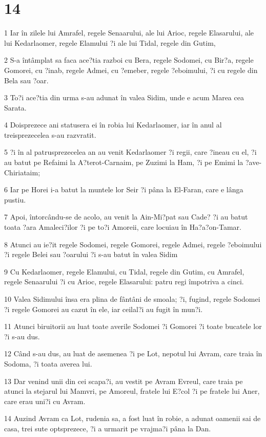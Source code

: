 \chapter{14}

\par 1 Iar în zilele lui Amrafel, regele Senaarului, ale lui Arioc, regele Elasarului, ale lui Kedarlaomer, regele Elamului ?i ale lui Tidal, regele din Gutim,
\par 2 S-a întâmplat sa faca ace?tia razboi cu Bera, regele Sodomei, cu Bir?a, regele Gomorei, cu ?inab, regele Admei, cu ?emeber, regele ?eboimului, ?i cu regele din Bela sau ?oar.
\par 3 To?i ace?tia din urma s-au adunat în valea Sidim, unde e acum Marea cea Sarata.
\par 4 Doisprezece ani statusera ei în robia lui Kedarlaomer, iar în anul al treisprezecelea s-au razvratit.
\par 5 ?i în al patrusprezecelea an au venit Kedarlaomer ?i regii, care ?ineau cu el, ?i au batut pe Refaimi la A?terot-Carnaim, pe Zuzimi la Ham, ?i pe Emimi la ?ave-Chiriataim;
\par 6 Iar pe Horei i-a batut la muntele lor Seir ?i pâna la El-Faran, care e lânga pustiu.
\par 7 Apoi, întorcându-se de acolo, au venit la Ain-Mi?pat sau Cade? ?i au batut toata ?ara Amaleci?ilor ?i pe to?i Amoreii, care locuiau în Ha?a?on-Tamar.
\par 8 Atunci au ie?it regele Sodomei, regele Gomorei, regele Admei, regele ?eboimului ?i regele Belei sau ?oarului ?i s-au batut în valea Sidim
\par 9 Cu Kedarlaomer, regele Elamului, cu Tidal, regele din Gutim, cu Amrafel, regele Senaarului ?i cu Arioc, regele Elasarului: patru regi împotriva a cinci.
\par 10 Valea Sidimului însa era plina de fântâni de smoala; ?i, fugind, regele Sodomei ?i regele Gomorei au cazut în ele, iar ceilal?i au fugit în mun?i.
\par 11 Atunci biruitorii au luat toate averile Sodomei ?i Gomorei ?i toate bucatele lor ?i s-au dus.
\par 12 Când s-au dus, au luat de asemenea ?i pe Lot, nepotul lui Avram, care traia în Sodoma, ?i toata averea lui.
\par 13 Dar venind unii din cei scapa?i, au vestit pe Avram Evreul, care traia pe atunci la stejarul lui Mamvri, pe Amoreul, fratele lui E?col ?i pe fratele lui Aner, care erau uni?i cu Avram.
\par 14 Auzind Avram ca Lot, rudenia sa, a fost luat în robie, a adunat oamenii sai de casa, trei sute optsprezece, ?i a urmarit pe vrajma?i pâna la Dan.

